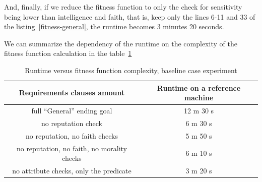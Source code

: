 \documentclass[12pt, a4paper]{report}
\begin{document}
	And, finally, if we reduce the fitness function to only the check for sensitivity being lower than intelligence and faith, that is, keep only the lines 6-11 and 33 of the listing~\ref{fitness-general}, the runtime becomes 3 minutes 20 seconds.
	
	We can summarize the dependency of the runtime on the complexity of the fitness function calculation in the table~\ref{table::runtime-per-complexity}
	
	
	\begin{table}[h!]
		\centering
		\caption{Runtime versus fitness function complexity, baseline case experiment}
		\label{table::runtime-per-complexity}
		\begin{tabular}{|c|c|}
			\hline
			Requirements clauses amount & Runtime on a reference machine \\ \hline
			full ``General'' ending goal & 12 m 30 s  \\ \hline
			no reputation check & 6 m 30 s \\ \hline
			no reputation, no faith checks & 5 m 50 s \\ \hline
			no reputation, no faith, no morality checks & 6 m 10 s \\ \hline
			no attribute checks, only the predicate & 3 m 20 s \\ \hline
		\end{tabular}
	\end{table}
	
\end{document}
